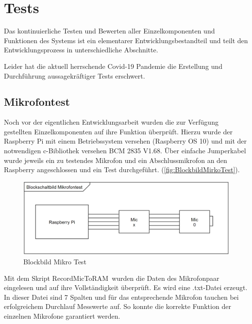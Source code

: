 \section{Tests}

Das kontinuierliche Testen und Bewerten aller Einzelkomponenten und Funktionen des Systems ist ein elementarer Entwicklungsbestandteil und teilt den Entwicklungsprozess in unterschiedliche Abschnitte.

Leider hat die aktuell herrschende Covid-19 Pandemie die Erstellung und Durchführung aussagekräftiger Tests erschwert. 

\subsection{Mikrofontest}

Noch vor der eigentlichen Entwicklungsarbeit wurden die zur Verfügung gestellten Einzelkomponenten auf ihre Funktion überprüft. Hierzu wurde der Raspberry Pi mit einem Betriebssystem versehen (Raspberry OS 10) und mit der notwendigen c-Bibliothek versehen BCM 2835 V1.68. Über einfache Jumperkabel wurde jeweils ein zu testendes Mikrofon und ein Abschlussmikrofon an den Raspberry angeschlossen und ein Test durchgeführt. (\autoref{fig:BlockbildMirkoTest}).

\begin{figure}[h]
	\begin{center}
		\includegraphics[scale=0.1]{Sections/Tests/BlockbildMikroTest}
	\end{center}
	\caption{Blockbild Mikro Test}
	\label{fig:BlockbildMikroTest}
\end{figure}

Mit dem Skript \glqq RecordMicToRAM\grqq\ wurden die Daten des Mikrofonpaar eingelesen und auf ihre Vollständigkeit überprüft. Es wird eine .txt-Datei erzeugt. In dieser Datei sind 7 Spalten und für das entsprechende Mikrofon tauchen bei erfolgreichem Durchlauf Messwerte auf. So konnte die korrekte Funktion der einzelnen Mikrofone garantiert werden.


